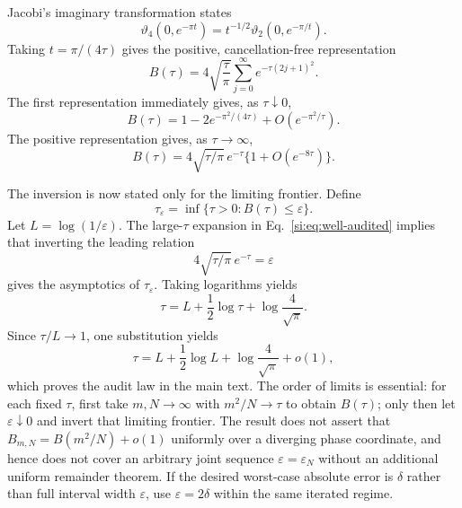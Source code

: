 Jacobi's imaginary transformation states
\begin{equation}
\vartheta_4(0,e^{-\pi t})
=t^{-1/2}\vartheta_2(0,e^{-\pi/t}).
\label{si:eq:modular}
\end{equation}
Taking $t=\pi/(4\tau)$ gives the positive, cancellation-free representation
\begin{equation}
B(\tau)=4\sqrt{\frac{\tau}{\pi}}
\sum_{j=0}^\infty e^{-\tau(2j+1)^2}.
\label{si:eq:positive-theta}
\end{equation}
The first representation immediately gives, as $\tau\downarrow0$,
\begin{equation}
B(\tau)=1-2e^{-\pi^2/(4\tau)}+O(e^{-\pi^2/\tau}).
\label{si:eq:under-audited}
\end{equation}
The positive representation gives, as $\tau\to\infty$,
\begin{equation}
B(\tau)=4\sqrt{\tau/\pi}\,e^{-\tau}
\{1+O(e^{-8\tau})\}.
\label{si:eq:well-audited}
\end{equation}

The inversion is now stated only for the limiting frontier. Define
\begin{equation}
\tau_\varepsilon=\inf\{\tau>0:B(\tau)\le\varepsilon\}.
\label{si:eq:tau-epsilon-definition}
\end{equation}
Let $L=\log(1/\varepsilon)$. The large-$\tau$ expansion in
Eq.~\ref{si:eq:well-audited} implies that inverting the leading relation
\begin{equation}
4\sqrt{\tau/\pi}\,e^{-\tau}=\varepsilon
\label{si:eq:invert-leading}
\end{equation}
gives the asymptotics of $\tau_\varepsilon$. Taking logarithms yields
\begin{equation}
\tau=L+\frac12\log\tau+\log\frac4{\sqrt\pi}.
\label{si:eq:implicit-tau}
\end{equation}
Since $\tau/L\to1$, one substitution yields
\begin{equation}
\tau=L+\frac12\log L+\log\frac4{\sqrt\pi}+o(1),
\label{si:eq:audit-law}
\end{equation}
which proves the audit law in the main text. The order of limits is essential:
for each fixed $\tau$, first take $m,N\to\infty$ with $m^2/N\to\tau$ to obtain
$B(\tau)$; only then let $\varepsilon\downarrow0$ and invert that limiting
frontier. The result does not assert that
$B_{m,N}=B(m^2/N)+o(1)$ uniformly over a diverging phase coordinate, and hence
does not cover an arbitrary joint sequence $\varepsilon=\varepsilon_N$ without
an additional uniform remainder theorem. If the desired worst-case absolute
error is $\delta$ rather than full interval width $\varepsilon$, use
$\varepsilon=2\delta$ within the same iterated regime.

